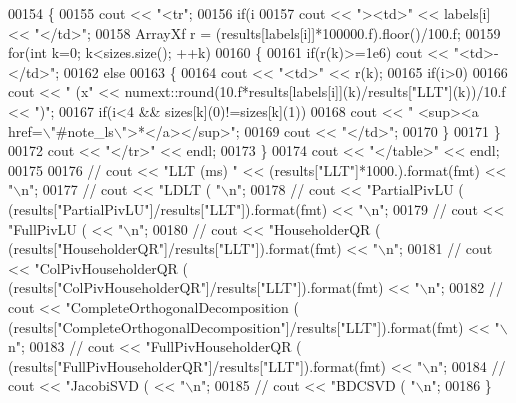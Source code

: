 \begin{DoxyCode}
00154   \{
00155     cout << \textcolor{stringliteral}{"<tr"};
00156     \textcolor{keywordflow}{if}(i%
00157     cout << \textcolor{stringliteral}{"><td>"} << labels[i] << \textcolor{stringliteral}{"</td>"};
00158     ArrayXf r = (results[labels[i]]*100000.f).floor()/100.f;
00159     \textcolor{keywordflow}{for}(\textcolor{keywordtype}{int} k=0; k<sizes.size(); ++k)
00160     \{
00161       \textcolor{keywordflow}{if}(r(k)>=1e6) cout << \textcolor{stringliteral}{"<td>-</td>"};
00162       \textcolor{keywordflow}{else}
00163       \{
00164         cout << \textcolor{stringliteral}{"<td>"} << r(k);
00165         \textcolor{keywordflow}{if}(i>0)
00166           cout << \textcolor{stringliteral}{" (x"} << numext::round(10.f*results[labels[i]](k)/results[\textcolor{stringliteral}{"LLT"}](k))/10.f << \textcolor{stringliteral}{")"};
00167         \textcolor{keywordflow}{if}(i<4 && sizes[k](0)!=sizes[k](1))
00168           cout << \textcolor{stringliteral}{" <sup><a href=\(\backslash\)"#note\_ls\(\backslash\)">*</a></sup>"};
00169         cout << \textcolor{stringliteral}{"</td>"};
00170       \}
00171     \}
00172     cout << \textcolor{stringliteral}{"</tr>"} << endl;
00173   \}
00174   cout << \textcolor{stringliteral}{"</table>"} << endl;
00175 
00176 \textcolor{comment}{//   cout << "LLT                             (ms)  " << (results["LLT"]*1000.).format(fmt) << "\(\backslash\)n";}
00177 \textcolor{comment}{//   cout << "LDLT                             (%
       "\(\backslash\)n";}
00178 \textcolor{comment}{//   cout << "PartialPivLU                     (%
       (results["PartialPivLU"]/results["LLT"]).format(fmt) << "\(\backslash\)n";}
00179 \textcolor{comment}{//   cout << "FullPivLU                        (%
       << "\(\backslash\)n";}
00180 \textcolor{comment}{//   cout << "HouseholderQR                    (%
       (results["HouseholderQR"]/results["LLT"]).format(fmt) << "\(\backslash\)n";}
00181 \textcolor{comment}{//   cout << "ColPivHouseholderQR              (%
       (results["ColPivHouseholderQR"]/results["LLT"]).format(fmt) << "\(\backslash\)n";}
00182 \textcolor{comment}{//   cout << "CompleteOrthogonalDecomposition  (%
       (results["CompleteOrthogonalDecomposition"]/results["LLT"]).format(fmt) << "\(\backslash\)n";}
00183 \textcolor{comment}{//   cout << "FullPivHouseholderQR             (%
       (results["FullPivHouseholderQR"]/results["LLT"]).format(fmt) << "\(\backslash\)n";}
00184 \textcolor{comment}{//   cout << "JacobiSVD                        (%
       << "\(\backslash\)n";}
00185 \textcolor{comment}{//   cout << "BDCSVD                           (%
       "\(\backslash\)n";}
00186 \}
\end{DoxyCode}
